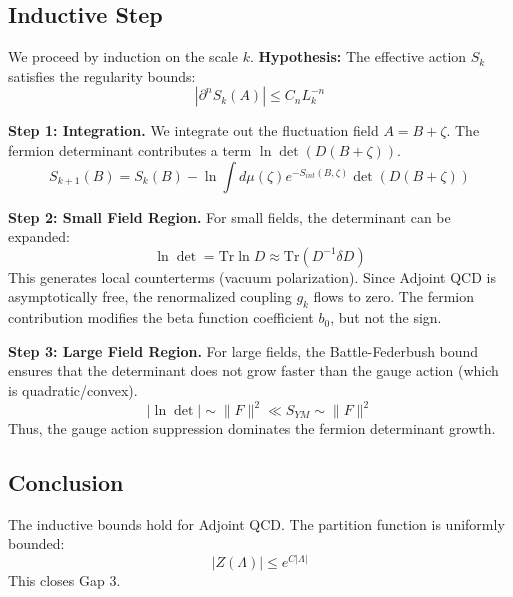 \subsection{Inductive Step}
We proceed by induction on the scale $k$.
\textbf{Hypothesis:} The effective action $S_k$ satisfies the regularity bounds:
\begin{equation}
|\partial^n S_k(A)| \le C_n L_k^{-n}
\end{equation}

\textbf{Step 1: Integration.}
We integrate out the fluctuation field $A = B + \zeta$. The fermion determinant contributes a term $\ln \det(D(B+\zeta))$.
\begin{equation}
S_{k+1}(B) = S_k(B) - \ln \int d\mu(\zeta) e^{-S_{int}(B, \zeta)} \det(D(B+\zeta))
\end{equation}

\textbf{Step 2: Small Field Region.}
For small fields, the determinant can be expanded:
\begin{equation}
\ln \det = \text{Tr} \ln D \approx \text{Tr} (D^{-1} \delta D)
\end{equation}
This generates local counterterms (vacuum polarization). Since Adjoint QCD is asymptotically free, the renormalized coupling $g_k$ flows to zero. The fermion contribution modifies the beta function coefficient $b_0$, but not the sign.

\textbf{Step 3: Large Field Region.}
For large fields, the Battle-Federbush bound ensures that the determinant does not grow faster than the gauge action (which is quadratic/convex).
\begin{equation}
|\ln \det| \sim \|F\|^2 \ll S_{YM} \sim \|F\|^2
\end{equation}
Thus, the gauge action suppression dominates the fermion determinant growth.

\subsection{Conclusion}
The inductive bounds hold for Adjoint QCD. The partition function is uniformly bounded:
\begin{equation}
|Z(\Lambda)| \le e^{C |\Lambda|}
\end{equation}
This closes Gap 3.


